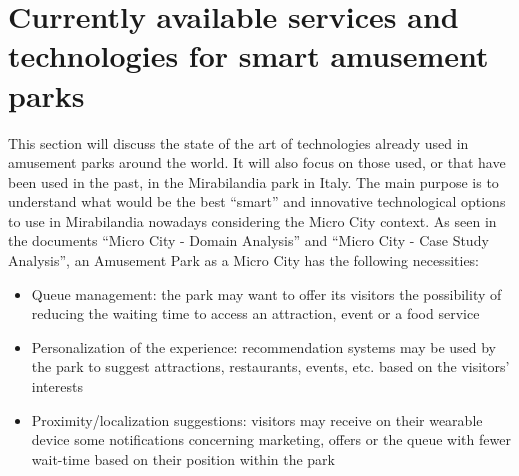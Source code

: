 

\section{Currently available services and technologies for smart amusement parks}\label{sec:state-of-the-art-analysis}
This section will discuss the state of the art of technologies already used in amusement parks around the world.
It will also focus on those used, or that have been used in the past, in the Mirabilandia park in Italy.
The main purpose is to understand what would be the best ``smart'' and innovative technological options to use in Mirabilandia nowadays considering the Micro City context.
As seen in the documents ``Micro City - Domain Analysis'' and ``Micro City - Case Study Analysis'', an Amusement Park as a Micro City has the following necessities:
\begin{itemize}
	\item Queue management: the park may want to offer its visitors the possibility of reducing the waiting time to access an attraction, event or a food service
	\item Personalization of the experience: recommendation systems may be used by the park to suggest attractions, restaurants, events, etc.
	      based on the visitors' interests
	\item Proximity/localization suggestions: visitors may receive on their wearable device some notifications concerning marketing, offers or the queue with fewer wait-time based on their position within the park
\end{itemize}

